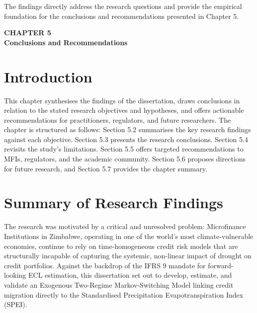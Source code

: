 \documentclass[12pt,a4paper]{article}
\begin{document}
The findings directly address the research questions and provide the empirical foundation for the conclusions and recommendations presented in Chapter 5.

\newpage

\begin{center}
    {\LARGE\bfseries CHAPTER 5}\\[0.5cm]
    {\Large\bfseries Conclusions and Recommendations}
\end{center}
\setcounter{section}{0}
\renewcommand{\thesection}{5.\arabic{section}}

\vspace{1cm}

\section{Introduction}

This chapter synthesises the findings of the dissertation, draws conclusions in relation to the stated research objectives and hypotheses, and offers actionable recommendations for practitioners, regulators, and future researchers. The chapter is structured as follows: Section 5.2 summarises the key research findings against each objective. Section 5.3 presents the research conclusions. Section 5.4 revisits the study's limitations. Section 5.5 offers targeted recommendations to MFIs, regulators, and the academic community. Section 5.6 proposes directions for future research, and Section 5.7 provides the chapter summary.

\section{Summary of Research Findings}

The research was motivated by a critical and unresolved problem: Microfinance Institutions in Zimbabwe, operating in one of the world's most climate-vulnerable economies, continue to rely on time-homogeneous credit risk models that are structurally incapable of capturing the systemic, non-linear impact of drought on credit portfolios. Against the backdrop of the IFRS 9 mandate for forward-looking ECL estimation, this dissertation set out to develop, estimate, and validate an Exogenous Two-Regime Markov-Switching Model linking credit migration directly to the Standardised Precipitation Evapotranspiration Index (SPEI).
\end{document}
